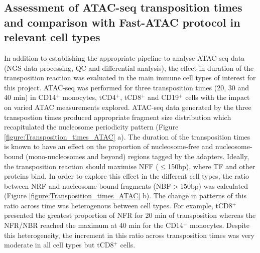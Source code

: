 \subsection{Assessment of ATAC-seq transposition times and comparison with Fast-ATAC protocol in relevant cell types}
In addition to establishing the appropriate pipeline to analyse ATAC-seq data (NGS data processing, QC and differential analysis), the effect in duration of the transposition reaction was evaluated in the main immune cell types of interest for this project. ATAC-seq was performed for three transposition times (20, 30 and 40 min) in CD14$^+$ monocytes, tCD4$^+$, tCD8$^+$ and CD19$^+$ cells with the impact on varied ATAC measurements explored. ATAC-seq data generated by the three transpostion times produced appropriate fragment size distribution which recapitulated the nucleosome periodicity pattern (Figure \ref{figure:Transposition_times_ATAC} a). The duration of the transposition times is known to have an effect on the proportion of nucleosome-free and nucleosome-bound (mono-nucleosomes and beyond) regions tagged by the adapters. Ideally, the transposition reaction should maximise NFF ($\leq$150bp), where TF and other proteins bind. In order to explore this effect in the different cell types, the ratio between NRF and nucleosome bound fragments (NBF$>$150bp) was calculated (Figure \ref{figure:Transposition_times_ATAC} b). The change in patterns of this ratio across time was heterogenous between cell types. For example, tCD8$^+$ presented the greatest proportion of NFR for 20 min of transposition whereas the NFR/NBR reached the maximum at 40 min for the CD14$^+$ monocytes. Despite this heterogeneity, the increment in this ratio across transposition times was very moderate in all cell types but tCD8$^+$ cells. 


